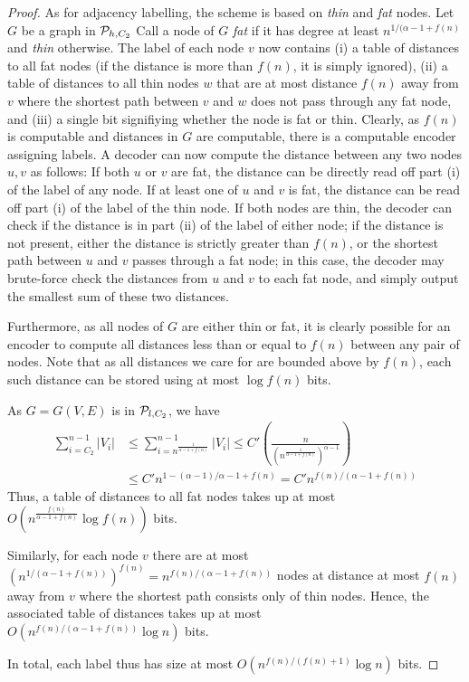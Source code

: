 \begin{proof}
As for adjacency labelling, the scheme is based on \emph{thin} and \emph{fat} nodes. Let $G$ be a graph
in $ \mathcal{P}_{h,C_2}$ Call
a node of $G$ \emph{fat} if it has degree at least $n^{1/(\alpha - 1 + f(n)}$ and \emph{thin} otherwise.
The label of each node $v$ now contains (i) a table of distances to all fat nodes (if the distance is more than $f(n)$, it is simply ignored), (ii) a table of distances to all thin nodes $w$ that are at most distance $f(n)$ away from $v$
where the shortest path between $v$ and $w$ does not pass through any fat node, and (iii) a single bit signifiying whether the node is fat or thin.
Clearly, as $f(n)$ is computable and distances in $G$ are computable, there is a computable encoder
assigning labels. A decoder can now compute the distance between any two nodes $u,v$ as follows:
If both $u$ or $v$ are fat, the distance can be directly read off part (i) of the label of any node. If at least one of $u$ 
and $v$ is fat, the distance can be read off part (i) of the label of the thin node. If both nodes are thin, the decoder
can check if the distance is in part (ii) of the label of either node; if the distance is not present, 
either the distance is strictly greater than $f(n)$, or the shortest path between $u$ and $v$ passes through
a fat node; in this case, the decoder may brute-force check the distances from $u$ and $v$ to each fat node,
and simply output the smallest sum of these two distances.

Furthermore, as all nodes of $G$ are either thin or fat, it is clearly possible for an encoder to compute
all distances less than or equal to $f(n)$ between any pair of nodes. Note that as all distances we care for 
are bounded above by $f(n)$, each such distance can be stored using at most $\log f(n)$ bits.

As $G = G(V,E)$ is in $ \mathcal{P}_{l,C_2}$, we have 
\begin{align*}
\sum_{i = C_2}^{n-1} \vert V_i \vert
&\leq \sum_{i = n^{\frac{1}{\alpha - 1 + f(n)}}}^{n-1} \vert V_i \vert \leq C' \left( \frac{n}{\left( n^{\frac{1}{\alpha - 1 + f(n)}}\right)^{\alpha - 1}}\right)\\
&\leq C' n^{1 - (\alpha - 1)/{\alpha-1 + f(n)}} 
= C' n^{f(n)/(\alpha - 1 + f(n))}
\end{align*}
 Thus, a table of distances to all fat nodes takes up at most $O\left(n^{\frac{f(n)}{\alpha - 1 + f(n)}} \log f(n)\right)$ bits.

Similarly, for each node $v$ there are at most $\left(n^{1/(\alpha - 1 + f(n))}\right)^{f(n)} = n^{f(n)/(\alpha - 1 + f(n))}$ nodes at distance at most $f(n)$ away from $v$ where the shortest path consists only of thin nodes. Hence, the associated table of distances
takes up at most \\$O(n^{f(n)/(\alpha -1 + f(n))} \log n)$ bits.

In total, each label thus has size at most $O(n^{f(n)/(f(n)+1)} \log n)$ bits.
\end{proof}

